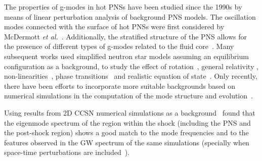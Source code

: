  The {properties of} g-modes in hot {PNSs} have been studied since the 1990s
 {by means of linear perturbation analysis of background PNS models}. The oscillation modes connected with the surface of hot PNSs were first considered by McDermott {\it et al.}~\citep{McDermott:1983}. Additionally, the stratified structure of the PNS allows for the presence of different types of g-modes related to the fluid core~\citep{Reisenegger:1992}. Many subsequent works used simplified neutron star models assuming an equilibrium configuration {as a background}, to study the effect of rotation~\citep{Ferrari:2004}, general relativity \citep{Passamonti:2005}, non-linearities~\citep{Dimmelmeier:2006}, phase transitions~\citep{Kruger:2015} and realistic equation of state~\citep{Camelio:2017}. {Only recently, there have been efforts to incorporate more suitable backgrounds based on numerical simulations in the computation of the mode structure and evolution~\citep{Sotani:2016,Torres:2018, Morozova:2018, Torres:2019a,Torres:2019b,Sotani:2019,WS:2019,Sotani:2020a, Sotani:2020b}}.
 
Using results from 2D CCSN numerical simulations as a background~\citep{Torres:2018, Torres:2019a} found that the eigenmode spectrum of the region within the shock (including the PNS and the post-shock region) 
shows a good match to the mode frequencies and to the features observed in the GW spectrum of the same simulations (specially when space-time perturbations are included~\citep{Torres:2019a}).

